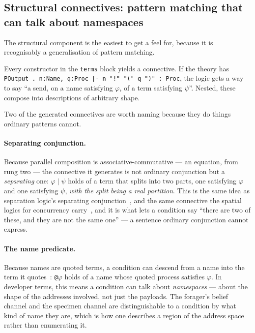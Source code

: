 \subsection{Structural connectives: pattern matching that can talk about namespaces}

The structural component is the easiest to get a feel for, because it is
recognisably a generalisation of pattern matching.

Every constructor in the \texttt{terms} block yields a connective. If the theory
has \texttt{POutput . n:Name, q:Proc |- n "!" "(" q ")" : Proc}, the logic gets a
way to say ``a send, on a name satisfying $\varphi$, of a term satisfying
$\psi$''. Nested, these compose into descriptions of arbitrary shape.

Two of the generated connectives are worth naming because they do things
ordinary patterns cannot.

\paragraph{Separating conjunction.} Because parallel composition is
associative-commutative --- an equation, from rung two --- the connective it
generates is not ordinary conjunction but a \emph{separating} one: $\varphi \mid
\psi$ holds of a term that splits into two parts, one satisfying $\varphi$ and
one satisfying $\psi$, \emph{with the split being a real partition}. This is the
same idea as separation logic's separating conjunction~\cite{Reynolds02}, and
the same connective the spatial logics for concurrency
carry~\cite{CairesCardelli03}, and it is what lets a
condition say ``there are two of these, and they are not the same one'' --- a
sentence ordinary conjunction cannot express.

\paragraph{The name predicate.} Because names are quoted terms, a condition can
descend from a name into the term it quotes~\cite{NamespaceLogic}: \texttt{@}$\varphi$ holds of a name
whose quoted process satisfies $\varphi$. In developer terms, this means a
condition can talk about \emph{namespaces} --- about the shape of the addresses
involved, not just the payloads. The forager's belief channel and the specimen
channel are distinguishable to a condition by what kind of name they are, which
is how one describes a region of the address space rather than enumerating it.

